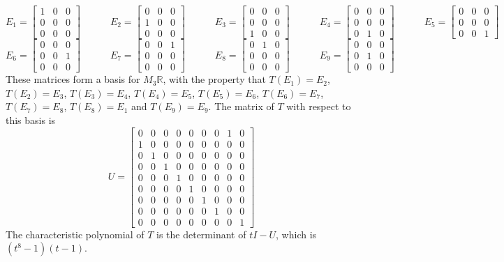 \documentclass[a4paper]{amsart}
\newcommand{\R}         {{\mathbb{R}}}
\newcommand{\bpm}       {\left[\begin{matrix}}
\newcommand{\epm}       {\end{matrix}\right]}
\renewcommand{\:}{\colon}
\theoremstyle{definition}
\newenvironment{solution}{{\noindent \bf Solution:}}{}
\begin{document}
\begin{solution}
 {\tiny \[
  E_1 = \bpm 1&0&0\\0&0&0\\0&0&0\epm \hspace{3em}
  E_2 = \bpm 0&0&0\\1&0&0\\0&0&0\epm \hspace{3em}
  E_3 = \bpm 0&0&0\\0&0&0\\1&0&0\epm \hspace{3em}
  E_4 = \bpm 0&0&0\\0&0&0\\0&1&0\epm \hspace{3em}
  E_5 = \bpm 0&0&0\\0&0&0\\0&0&1\epm 
 \] \[
  E_6 = \bpm 0&0&0\\0&0&1\\0&0&0\epm \hspace{3em}
  E_7 = \bpm 0&0&1\\0&0&0\\0&0&0\epm \hspace{3em}
  E_8 = \bpm 0&1&0\\0&0&0\\0&0&0\epm \hspace{3em}
  E_9 = \bpm 0&0&0\\0&1&0\\0&0&0\epm  
 \]}
 These matrices form a basis for $M_3\R$, with the property
 that
 $T(E_1)=E_2$, 
 $T(E_2)=E_3$, 
 $T(E_3)=E_4$, 
 $T(E_4)=E_5$, 
 $T(E_5)=E_6$, 
 $T(E_6)=E_7$, 
 $T(E_7)=E_8$, 
 $T(E_8)=E_1$ and 
 $T(E_9)=E_9$.  The matrix of $T$ with respect to this basis
 is 
 {\tiny \[ U = \bpm 
     0 & 0 & 0 & 0 & 0 & 0 & 0 & 1 & 0 \\
     1 & 0 & 0 & 0 & 0 & 0 & 0 & 0 & 0 \\
     0 & 1 & 0 & 0 & 0 & 0 & 0 & 0 & 0 \\
     0 & 0 & 1 & 0 & 0 & 0 & 0 & 0 & 0 \\
     0 & 0 & 0 & 1 & 0 & 0 & 0 & 0 & 0 \\
     0 & 0 & 0 & 0 & 1 & 0 & 0 & 0 & 0 \\
     0 & 0 & 0 & 0 & 0 & 1 & 0 & 0 & 0 \\
     0 & 0 & 0 & 0 & 0 & 0 & 1 & 0 & 0 \\
     0 & 0 & 0 & 0 & 0 & 0 & 0 & 0 & 1 
    \epm
 \]}
 The characteristic polynomial of $T$ is the determinant of
 $tI-U$, which is $(t^8-1)(t-1)$.
\end{solution}
\end{document}
